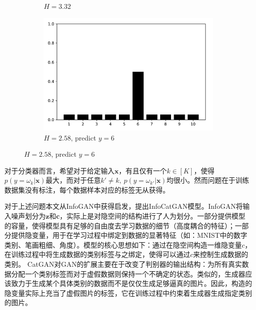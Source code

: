 \begin{figure}[htbp]
\begin{subfigure}[b]{\trif\textwidth}
    \caption{$H = 3.32$}
  \end{subfigure}
  \begin{subfigure}[b]{\trif\textwidth}
    \includegraphics[width=\textwidth]{Img/entc.pdf}
    \caption{$H = 2.58$, predict $y=6$}
  \end{subfigure}
  \label{fig:ent}
\end{figure}
对于分类器而言，希望对于给定输入$\mathbf{x}$，有且仅有一个$k \in [K]$，使得$p(y=\omega_k|\mathbf{x})$最大，而对于任意$k' \neq k, ~p(y=\omega_{k'}|\mathbf{x})$均很小。然而问题在于训练数据集没有标注，每个数据样本对应的标签无从获得。

对于上述问题本文从InfoGAN中获得启发，提出InfoCatGAN模型。InfoGAN将输入噪声划分为$\mathbf{z}$和$\mathbf{c}$，实际上是对隐空间的结构进行了人为划分。一部分提供模型的容量，使得模型具有足够的自由度去学习数据的细节（高度耦合的特征）；一部分提供隐变量，用于在学习过程中绑定到数据的显著特征（如：MNIST中的数字类别、笔画粗细、角度）。模型的核心思想如下：通过在隐空间构造一维隐变量$c$，在训练过程中将生成数据的类别标签与之绑定，使得可以通过$c$来控制生成数据的类别。
CatGAN对GAN的扩展主要在于改变了判别器的输出结构：为所有真实数据分配一个类别标签而对于虚假数据则保持一个不确定的状态。类似的，生成器应该致力于生成某个具体类别的数据而不是仅仅生成足够逼真的图片。因此，构造的隐变量实际上充当了虚假图片的标签，它在训练过程中约束着生成器生成指定类别的图片。

